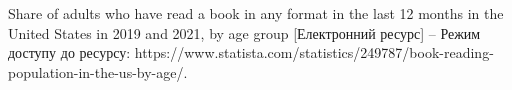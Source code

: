 {
    \renewcommand{\bibname}{Перелік джерел посилання} %

    
    \renewcommand\UrlFont{\color{red}\rmfamily\itshape}
    \begin{thebibliography}{9}
        \linespread{1.43}

        Share of adults who have read a book in any format in the last 12 months in the United States in 2019 and 2021, by age group [Електронний ресурс] – Режим доступу до ресурсу: https://www.statista.com/statistics/249787/book-reading-population-in-the-us-by-age/.



    \end{thebibliography}
}